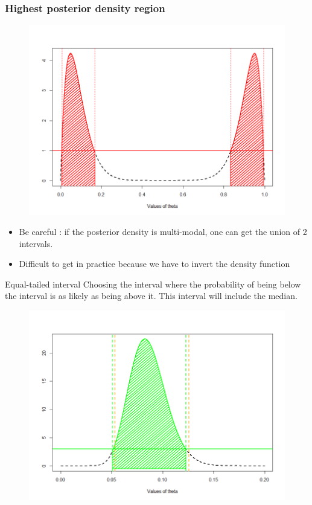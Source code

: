 \begin{frame}\frametitle{Highest posterior density region }

 \begin{figure}
\centering 
 \includegraphics[width=0.6\linewidth]{figures/HPD_bimod.png}
 \end{figure}

\begin{itemize}
\item Be careful : if the posterior density is multi-modal, one can get the union of 2 intervals. 
\item Difficult to get in practice because we have to invert the density function
\end{itemize}

\end{frame}
\begin{frame}

\begin{block}{Equal-tailed interval} 
Choosing the interval where the probability of being below the interval is as likely as being above it. This interval will include the median. 
\end{block}

\begin{figure}
\centering 
 \includegraphics[width=0.8\linewidth]{figures/Equi_tailes.png}
 \end{figure}
 
  \hyperlink{BF}{}
 
\end{frame}

